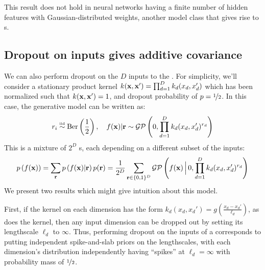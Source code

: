 This result does not hold in neural networks having a finite number of hidden features with Gaussian-distributed weights, another model class that gives rise to \gp{}s.

\subsection{Dropout on inputs gives additive covariance}

We can also perform dropout on the $D$ inputs to the \gp{}.
For simplicity, we'll consider a stationary product kernel ${k({\bf{x}}, {\bf{x}}') = \prod_{d=1}^D k_d(x_d, x_d')}$ which has been normalized such that $k({\bf{x}}, {\bf{x}}') = 1$, and dropout probability of $p = \nicefrac{1}{2}$.
In this case, the generative model can be written as:
%
\begin{align}
r_i \overset{\mbox{\tiny iid}}{\sim} \textnormal{Ber} \left( \frac{1}{2} \right), \quad f({\bf{x}}) | {\bf{r}} \sim \mathcal{GP} \left( 0, \prod_{d=1}^D k_d(x_d, x_d')^{r_d} \right)
\end{align}
%
This is a mixture of $2^D$ \gp{}s, each depending on a different subset of the inputs:
%
\begin{align}
p \left( f({\bf{x}}) \right) = 
\sum_{{\bf{r}}} p \left( f({\bf{x}}) | {\bf{r}} \right) p( {\bf{r}}) = 
\frac{1}{2^D} \sum_{{\bf{r}} \in \{0,1\}^D}  \mathcal{GP} \left(f({\bf{x}}) \,\Big|\, 0, \prod_{d=1}^D k_d(x_d, x_d')^{r_d} \right)
\label{eq:dropout-mixture}
\end{align}
We present two results which might give intuition about this model.

First, if the kernel on each dimension has the form ${k_d(x_d, x_d') = g \left( \frac{x_d - x_d'}{\ell_d} \right)}$, as does the \kSE{} kernel, then any input dimension can be dropped out by setting its lengthscale $\ell_d$ to $\infty$.
Thus, performing dropout on the inputs of a \gp{} corresponds to putting independent spike-and-slab priors on the lengthscales, with each dimension's distribution independently having ``spikes'' at $\ell_d = \infty$ with probability mass of $\nicefrac{1}{2}$.



